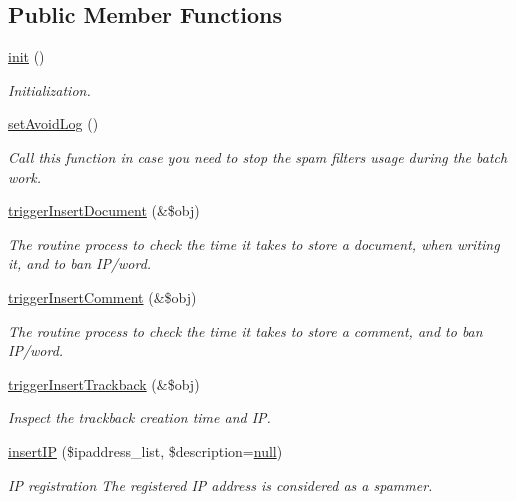 \subsection*{Public Member Functions}
\begin{DoxyCompactItemize}
\item 
\hyperlink{classspamfilterController_a8204da601e789d60dbdfe0f692537e70}{init} ()
\begin{DoxyCompactList}\small\item\em Initialization. \end{DoxyCompactList}\item 
\hyperlink{classspamfilterController_a31282e59e182dca5e3f94e4c9122578d}{set\+Avoid\+Log} ()
\begin{DoxyCompactList}\small\item\em Call this function in case you need to stop the spam filter\textquotesingle{}s usage during the batch work. \end{DoxyCompactList}\item 
\hyperlink{classspamfilterController_a9ed78c37a603b06cb067ecdc523a2ae4}{trigger\+Insert\+Document} (\&\$obj)
\begin{DoxyCompactList}\small\item\em The routine process to check the time it takes to store a document, when writing it, and to ban I\+P/word. \end{DoxyCompactList}\item 
\hyperlink{classspamfilterController_ac01aa63960909cc5c95bfae15ded5d99}{trigger\+Insert\+Comment} (\&\$obj)
\begin{DoxyCompactList}\small\item\em The routine process to check the time it takes to store a comment, and to ban I\+P/word. \end{DoxyCompactList}\item 
\hyperlink{classspamfilterController_ace7cf6178aa16638526af5d73a9554eb}{trigger\+Insert\+Trackback} (\&\$obj)
\begin{DoxyCompactList}\small\item\em Inspect the trackback creation time and IP. \end{DoxyCompactList}\item 
\hyperlink{classspamfilterController_aab95351e0ebeffec58d24354aa92e3f5}{insert\+IP} (\$ipaddress\+\_\+list, \$description=\hyperlink{modernizr_8min_8js_a286f9ec831c5e676eeb493248eab9575}{null})
\begin{DoxyCompactList}\small\item\em IP registration The registered IP address is considered as a spammer. \end{DoxyCompactList}\item 

\end{DoxyCompactItemize}
